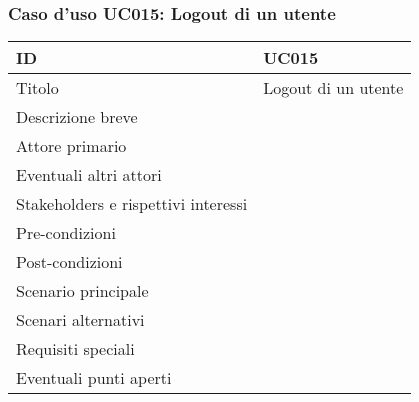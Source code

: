 \documentclass[../../main.tex]{subfiles}
\begin{document}
\subsubsection{Caso d’uso UC015: Logout di un utente }
\begin{tabularx}{150mm}{|l|X|}
    \hline
    ID                                  & \textbf{UC015}\\
    \hline
    Titolo                              & Logout di un utente \\
    \hline
    Descrizione breve                   &    \\
    \hline
    Attore primario                     &    \\
    \hline
    Eventuali altri attori              &    \\
    \hline
    Stakeholders e rispettivi interessi &    \\
    \hline
    Pre-condizioni                      &    \\
    \hline
    Post-condizioni                     &    \\
    \hline
    Scenario principale                 &    \\
    \hline
    Scenari alternativi                 &    \\
    \hline
    Requisiti speciali                  &    \\
    \hline
    Eventuali punti aperti              &    \\
    \hline
\end{tabularx}
\newpage
\end{document}
